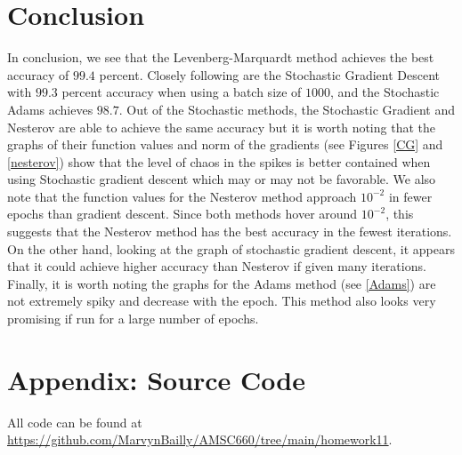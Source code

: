 \documentclass[12pt]{article}%
\begin{document}
\section{Conclusion}
In conclusion, we see that the Levenberg-Marquardt method achieves the best accuracy of $99.4$ percent. Closely following are the Stochastic Gradient Descent with $99.3$ percent accuracy when using a batch size of $1000$, and the Stochastic Adams achieves $98.7$. Out of the Stochastic methods, the Stochastic Gradient and Nesterov are able to achieve the same accuracy but it is worth noting that the graphs of their function values and norm of the gradients (see Figures \ref{CG} and \ref{nesterov}) show that the level of chaos in the spikes is better contained when using Stochastic gradient descent which may or may not be favorable. We also note that the function values for the Nesterov method approach $10^{-2}$ in fewer epochs than gradient descent. Since both methods hover around $10^{-2}$, this suggests that the Nesterov method has the best accuracy in the fewest iterations. On the other hand, looking at the graph of stochastic gradient descent, it appears that it could achieve higher accuracy than Nesterov if given many iterations. Finally, it is worth noting the graphs for the Adams method (see \ref{Adams}) are not extremely spiky and decrease with the epoch. This method also looks very promising if run for a large number of epochs.

\appendix
\section{Appendix: Source Code}
All code can be found at \url{https://github.com/MarvynBailly/AMSC660/tree/main/homework11}.
\end{document}
